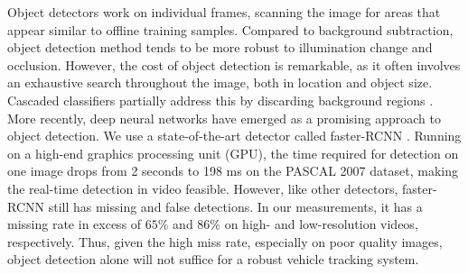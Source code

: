 Object detectors \cite{felzenszwalb2010cascade,girshick2014rich} %
work on individual frames, scanning the image for areas that appear similar to offline training samples. 
Compared to background subtraction, object detection method tends to be more robust to illumination change and occlusion.
However, the cost of object detection is remarkable, as it often involves an exhaustive search throughout the image, both in location and object size.
%
Cascaded classifiers partially address this by discarding background regions \cite{felzenszwalb2010cascade}.
More recently, deep neural networks \cite{girshick2014rich,renNIPS15fasterrcnn} have emerged as a promising approach to object detection. %
We use a state-of-the-art detector called faster-RCNN \cite{renNIPS15fasterrcnn}.
Running on a high-end graphics processing unit (GPU), the time required for detection on one image drops from 2 seconds \cite{felzenszwalb2010cascade} to 198 ms on the PASCAL 2007 dataset, making the real-time detection in video feasible. 
However, like other detectors, faster-RCNN still has missing and false detections. In our measurements, it has a missing rate in excess of $65\%$ and $86\%$ on high- and low-resolution videos, respectively.
Thus, given the high miss rate, especially on poor quality images, object detection alone will not suffice for a robust vehicle tracking system. 



